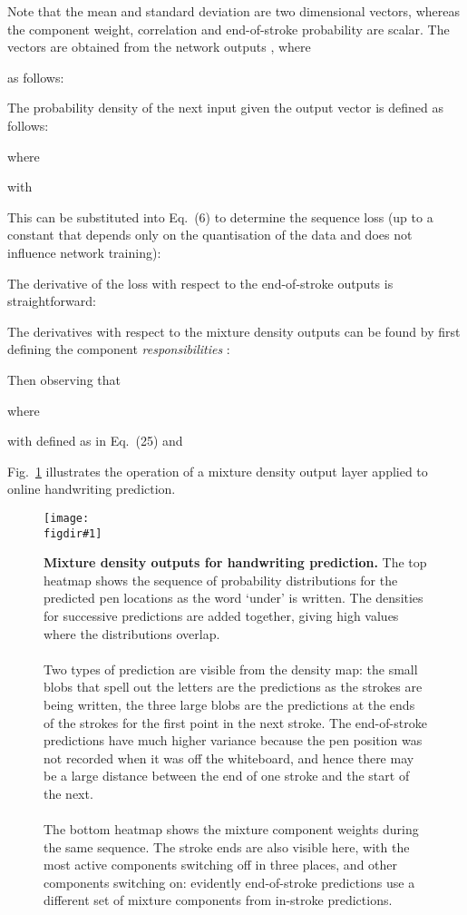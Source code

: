 \documentclass{article}
\newcommand{\flabel}[1]{\label{fig:#1}}
\newcommand{\fref}[1]{Fig.~\ref{fig:#1}}
\newcommand{\figdir}{}
\newcommand{\capt}[2]{\caption[#1]{\textbf{#1}#2}}
\newcommand{\fig}[5]
{
\begin{figure}
\begin{center}
\texttt{[image: \\figdir\#1]}
\end{center}
\capt{#4}{#5}
\flabel{#2}
\end{figure}
}
\begin{document}
Note that the mean and standard deviation are two dimensional vectors, whereas the component weight, correlation and end-of-stroke probability are scalar.
The vectors  are obtained from the network outputs , where

as follows:

The probability density  of the next input  given the output vector  is defined as follows:

where

with

This can be substituted into Eq.~(6) to determine the sequence loss (up to a constant that depends only on the quantisation of the data and does not influence network training):

The derivative of the loss with respect to the end-of-stroke outputs is straightforward:

The derivatives with respect to the mixture density outputs can be found by first defining the component \emph{responsibilities} :

Then observing that

where

with  defined as in Eq.~(25) and


\fref{pred_density} illustrates the operation of a mixture density output layer applied to online handwriting prediction. 

\fig{pred_density}{pred_density}{1}{Mixture density outputs for handwriting prediction.}{ The top heatmap shows the sequence of probability distributions for the predicted pen locations as the word `under' is written. The densities for successive predictions are added together, giving high values where the distributions overlap.\\\\
Two types of prediction are visible from the density map: the small blobs that spell out the letters are the predictions as the strokes are being written, the three large blobs are the predictions at the ends of the strokes for the first point in the next stroke. The end-of-stroke predictions have much higher variance because the pen position was not recorded when it was off the whiteboard, and hence there may be a large distance between the end of one stroke and the start of the next. \\\\
The bottom heatmap shows the mixture component weights during the same sequence. The stroke ends are also visible here, with the most active components switching off in three places, and other components switching on: evidently end-of-stroke predictions use a different set of mixture components from in-stroke predictions.}
\end{document}
